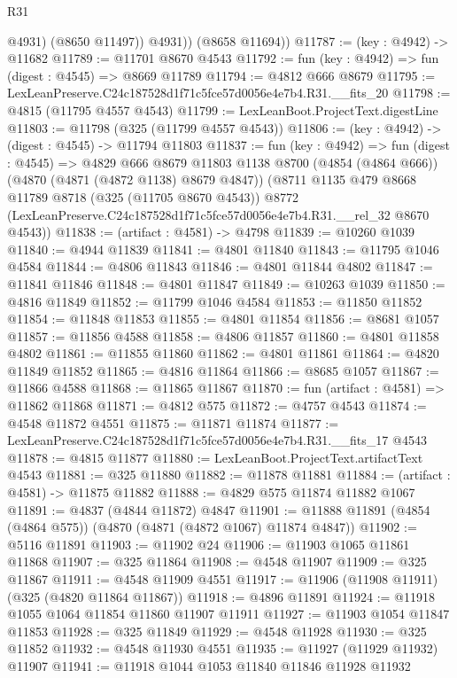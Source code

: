 \begin{lexlean}{R31}
\begin{coremodule}
              @4931)
            (@8650 @11497))
          @4931))
      (@8658 @11694))
@11787 := (key : @4942) -> @11682
@11789 := @11701 @8670 @4543
@11792 := fun (key : @4942) => fun (digest : @4545) => @8669 @11789
@11794 := @4812 @666 @8679
@11795 := LexLeanPreserve.C24c187528d1f71c5fce57d0056e4e7b4.R31.__fits_20
@11798 := @4815 (@11795 @4557 @4543)
@11799 := LexLeanBoot.ProjectText.digestLine
@11803 := @11798 (@325 (@11799 @4557 @4543))
@11806 := (key : @4942) -> (digest : @4545) -> @11794 @11803
@11837 := fun (key : @4942) =>
  fun (digest : @4545) =>
  @4829
    @666
    @8679
    @11803
    @1138
    @8700
    (@4854 (@4864 @666))
    (@4870 (@4871 (@4872 @1138) @8679 @4847))
    (@8711
      @1135
      @479
      @8668
      @11789
      @8718
      (@325 (@11705 @8670 @4543))
      @8772
      (LexLeanPreserve.C24c187528d1f71c5fce57d0056e4e7b4.R31.__rel_32 @8670 @4543))
@11838 := (artifact : @4581) -> @4798
@11839 := @10260 @1039
@11840 := @4944 @11839
@11841 := @4801 @11840
@11843 := @11795 @1046 @4584
@11844 := @4806 @11843
@11846 := @4801 @11844 @4802
@11847 := @11841 @11846
@11848 := @4801 @11847
@11849 := @10263 @1039
@11850 := @4816 @11849
@11852 := @11799 @1046 @4584
@11853 := @11850 @11852
@11854 := @11848 @11853
@11855 := @4801 @11854
@11856 := @8681 @1057
@11857 := @11856 @4588
@11858 := @4806 @11857
@11860 := @4801 @11858 @4802
@11861 := @11855 @11860
@11862 := @4801 @11861
@11864 := @4820 @11849 @11852
@11865 := @4816 @11864
@11866 := @8685 @1057
@11867 := @11866 @4588
@11868 := @11865 @11867
@11870 := fun (artifact : @4581) => @11862 @11868
@11871 := @4812 @575
@11872 := @4757 @4543
@11874 := @4548 @11872 @4551
@11875 := @11871 @11874
@11877 := LexLeanPreserve.C24c187528d1f71c5fce57d0056e4e7b4.R31.__fits_17 @4543
@11878 := @4815 @11877
@11880 := LexLeanBoot.ProjectText.artifactText @4543
@11881 := @325 @11880
@11882 := @11878 @11881
@11884 := (artifact : @4581) -> @11875 @11882
@11888 := @4829 @575 @11874 @11882 @1067
@11891 := @4837 (@4844 @11872) @4847
@11901 := @11888 @11891 (@4854 (@4864 @575)) (@4870 (@4871 (@4872 @1067) @11874 @4847))
@11902 := @5116 @11891
@11903 := @11902 @24
@11906 := @11903 @1065 @11861 @11868
@11907 := @325 @11864
@11908 := @4548 @11907
@11909 := @325 @11867
@11911 := @4548 @11909 @4551
@11917 := @11906 (@11908 @11911) (@325 (@4820 @11864 @11867))
@11918 := @4896 @11891
@11924 := @11918 @1055 @1064 @11854 @11860 @11907 @11911
@11927 := @11903 @1054 @11847 @11853
@11928 := @325 @11849
@11929 := @4548 @11928
@11930 := @325 @11852
@11932 := @4548 @11930 @4551
@11935 := @11927 (@11929 @11932) @11907
@11941 := @11918 @1044 @1053 @11840 @11846 @11928 @11932

\end{coremodule}
\end{lexlean}
